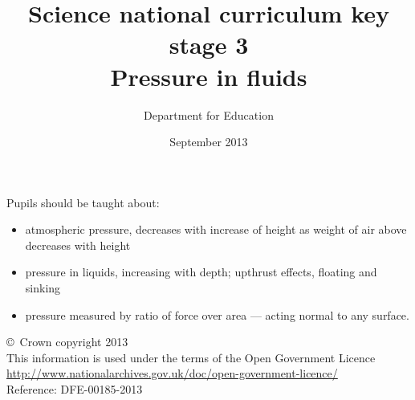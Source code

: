 \documentclass[a4paper,12pt]{article}
\begin{document}
\setcounter{secnumdepth}{0}

\title{Science national curriculum key stage 3\\Pressure in fluids}
\author{Department for Education}
\date{September 2013}
\maketitle

\thispagestyle{empty}

Pupils should be taught about:

\begin{itemize}
\item atmospheric pressure, decreases with increase of height as weight of air above
decreases with height
\item pressure in liquids, increasing with depth; upthrust effects, floating and sinking
\item pressure measured by ratio of force over area --- acting normal to any surface.
\end{itemize}

\vfill

\footnotesize
\noindent \copyright\ Crown copyright 2013\\
This information is used under the terms of the Open Government Licence\\
\url{http://www.nationalarchives.gov.uk/doc/open-government-licence/}\\
{\tiny Reference: DFE-00185-2013}
\end{document}
